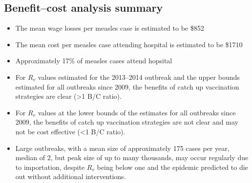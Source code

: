 \documentclass{article}
\begin{document}
\subsection{Benefit--cost analysis summary}
\begin{itemize}
\item The mean wage losses per measles case is estimated to be \$852
\item The mean cost per measles case attending hospital is estimated to be \$1710
\item Approximately 17\% of measles cases attend hopsital
\item For $R_v$ values estimated for the 2013--2014 outbreak and the upper bounds estimated for all outbreaks since 2009, the benefits of catch up vaccination strategies are clear (>1 B/C ratio).
\item For $R_v$ values at the lower bounds of the estimates for all outbreaks since 2009, the benefits of catch up vaccination strategies are not clear and may not be cost effective (<1 B/C ratio).
\item Large outbreaks, with a mean size of approximately 175 cases per year, median of 2, but peak size of up to many thousands, may occur regularly due to importation, despite $R_v$ being below one and the epidemic predicted to die out without additional interventions.
\end{itemize}
\end{document}
